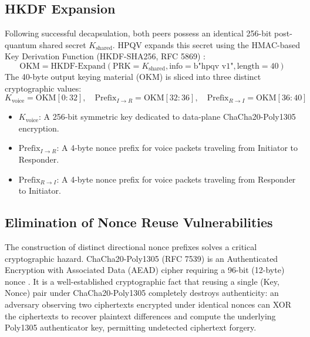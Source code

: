 \subsection{HKDF Expansion}
Following successful decapsulation, both peers possess an identical 256-bit post-quantum shared secret $K_{\text{shared}}$. HPQV expands this secret using the HMAC-based Key Derivation Function (HKDF-SHA256, RFC 5869) \cite{rfc5869}:
\begin{equation}
    \text{OKM} = \text{HKDF-Expand}(\text{PRK} = K_{\text{shared}}, \text{info} = \text{b"hpqv v1"}, \text{length} = 40)
\end{equation}
The 40-byte output keying material ($\text{OKM}$) is sliced into three distinct cryptographic values:
\begin{equation}
    K_{\text{voice}} = \text{OKM}[0:32],\quad \text{Prefix}_{I \to R} = \text{OKM}[32:36],\quad \text{Prefix}_{R \to I} = \text{OKM}[36:40]
\end{equation}
\begin{itemize}
    \item $K_{\text{voice}}$: A 256-bit symmetric key dedicated to data-plane ChaCha20-Poly1305 encryption.
    \item $\text{Prefix}_{I \to R}$: A 4-byte nonce prefix for voice packets traveling from Initiator to Responder.
    \item $\text{Prefix}_{R \to I}$: A 4-byte nonce prefix for voice packets traveling from Responder to Initiator.
\end{itemize}

\subsection{Elimination of Nonce Reuse Vulnerabilities}
The construction of distinct directional nonce prefixes solves a critical cryptographic hazard. ChaCha20-Poly1305 (RFC 7539) is an Authenticated Encryption with Associated Data (AEAD) cipher requiring a 96-bit (12-byte) nonce \cite{rfc7539}. It is a well-established cryptographic fact that reusing a single (Key, Nonce) pair under ChaCha20-Poly1305 completely destroys authenticity: an adversary observing two ciphertexts encrypted under identical nonces can XOR the ciphertexts to recover plaintext differences and compute the underlying Poly1305 authenticator key, permitting undetected ciphertext forgery.

